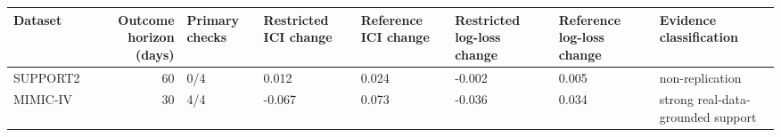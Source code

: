 \begin{tabular}{lrllllll}
\toprule
Dataset & Outcome horizon (days) & Primary checks & Restricted ICI change & Reference ICI change & Restricted log-loss change & Reference log-loss change & Evidence classification \\
\midrule
SUPPORT2 & 60 & 0/4 & 0.012 & 0.024 & -0.002 & 0.005 & non-replication \\
MIMIC-IV & 30 & 4/4 & -0.067 & 0.073 & -0.036 & 0.034 & strong real-data-grounded support \\
\bottomrule
\end{tabular}
